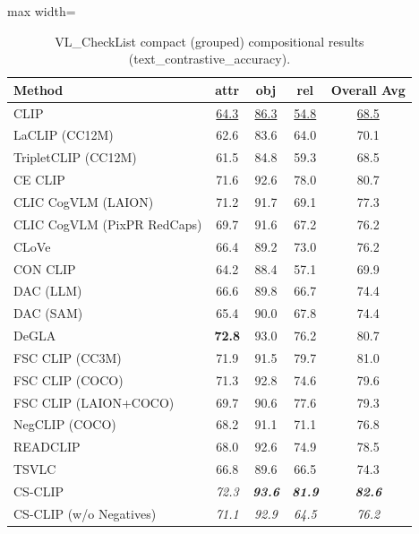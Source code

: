 \begin{table}[t]
  \centering
  \scriptsize
  \caption{VL_CheckList compact (grouped) compositional results (text_contrastive_accuracy).}
  \label{tab:VL_CheckList_compact}
  \begin{adjustbox}{max width=\textwidth}
  \setlength{\tabcolsep}{2pt}
  \begin{tabular}{p{5cm}ccc|c}
    \toprule
    Method & attr & obj & rel & Overall Avg \\
    \midrule
    CLIP & \underline{64.3} & \underline{86.3} & \underline{54.8} & \underline{68.5} \\
    \midrule
    LaCLIP (CC12M) & 62.6 & 83.6 & 64.0 & 70.1 \\
    TripletCLIP (CC12M) & 61.5 & 84.8 & 59.3 & 68.5 \\
    \midrule
    CE CLIP & 71.6 & 92.6 & 78.0 & 80.7 \\
    CLIC CogVLM (LAION) & 71.2 & 91.7 & 69.1 & 77.3 \\
    CLIC CogVLM (PixPR RedCaps) & 69.7 & 91.6 & 67.2 & 76.2 \\
    CLoVe & 66.4 & 89.2 & 73.0 & 76.2 \\
    CON CLIP & 64.2 & 88.4 & 57.1 & 69.9 \\
    DAC (LLM) & 66.6 & 89.8 & 66.7 & 74.4 \\
    DAC (SAM) & 65.4 & 90.0 & 67.8 & 74.4 \\
    DeGLA & \textbf{72.8} & 93.0 & 76.2 & 80.7 \\
    FSC CLIP (CC3M) & 71.9 & 91.5 & 79.7 & 81.0 \\
    FSC CLIP (COCO) & 71.3 & 92.8 & 74.6 & 79.6 \\
    FSC CLIP (LAION+COCO) & 69.7 & 90.6 & 77.6 & 79.3 \\
    NegCLIP (COCO) & 68.2 & 91.1 & 71.1 & 76.8 \\
    READCLIP & 68.0 & 92.6 & 74.9 & 78.5 \\
    TSVLC & 66.8 & 89.6 & 66.5 & 74.3 \\
    \midrule
    CS-CLIP & \emph{72.3} & \emph{\textbf{93.6}} & \emph{\textbf{81.9}} & \emph{\textbf{82.6}} \\
    CS-CLIP (w/o Negatives) & \emph{71.1} & \emph{92.9} & \emph{64.5} & \emph{76.2} \\
    \bottomrule
  \end{tabular}
  \end{adjustbox}
\end{table}